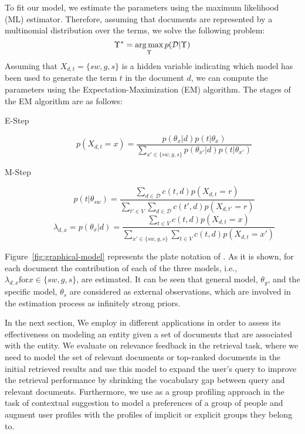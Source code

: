 To fit our model, we estimate the parameters using the maximum likelihood (ML) estimator. Therefore, assuming that documents are represented by a multinomial distribution over the terms, we solve the following problem:
\begin{equation}
\Upsilon^* = \operatorname*{arg\,max}_\Upsilon p(\mathcal{D}|\Upsilon)
\end{equation}
Assuming that $X_{d,t} = \{{sw},g,s\}$ is a hidden variable indicating which model has been used to generate the term $t$ in the document $d$, we can compute the parameters using the Expectation-Maximization (EM) algorithm. 
The stages of the EM algorithm are as follows:
\begin{description}
\item[E-Step]
\begin{equation}
p(X_{d,t} = x) = \frac{p(\theta_x|d)p(t|\theta_x)}{\sum_{x' \in \{sw,g,s\}}p(\theta_{x'}|d)p(t|\theta_{x'})}
\label{EM_e}
\end{equation}
\item[M-Step]
\begin{equation}
p(t|\theta_{sw}) = 
\frac{\sum_{d \in \mathcal{D}}c(t,d) p(X_{d,t} = r)}{\sum_{t' \in V}\sum_{d \in \mathcal{D}}c(t',d) p(X_{d,t'} = r)}
\label{EM_m1}
\end{equation}
\begin{equation}
\lambda_{d,x}  = p(\theta_x|d) = 
\frac{\sum_{t \in V}c(t,d) p(X_{d,t} = x)}{\sum_{x' \in \{sw,g,s\}}\sum_{t \in V}c(t,d) p(X_{d,t} = x')}
\label{EM_m2}
\end{equation}
\end{description}


Figure~\ref{fig:graphical-model} represents the plate notation of \acswlm. As it is shown, for each document the contribution of each of the three models, i.e., $\lambda_{d,x} \text{for} x \in \{sw,g,s\}$, are estimated. It can be seen that general model, $\theta_g$, and the specific model, $\theta_s$ are considered as external observations, which are involved in the estimation process as infinitely strong priors. 

In the next section, We employ \acswlm in different applications in order to assess its effectiveness on modeling an entity given a set of documents that are associated with the entity. We evaluate \acswlm on relevance feedback in the retrieval task, where we need to model the set of relevant documents or top-ranked documents in the initial retrieved results and use this model to expand the user's query to improve the retrieval performance by shrinking the vocabulary gap between query and relevant documents. Furthermore, we use \acswlm as a group profiling approach in the task of contextual suggestion to model a preferences of a group of people and augment user profiles with the profiles of implicit or explicit groups they belong to.